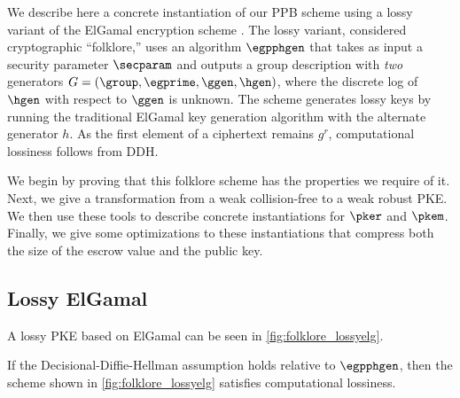 We describe here a concrete instantiation of our PPB scheme using a lossy variant of the ElGamal encryption scheme \cite{C:ElGamal84}.
% 
The lossy variant, considered cryptographic ``folklore,'' uses an algorithm $\egpphgen$ that takes as input a security parameter $\secparam$ and outputs a group description with \emph{two} generators $G = (\group, \egprime, \ggen, \hgen)$, where the discrete log of $\hgen$ with respect to $\ggen$ is unknown.
The scheme generates lossy keys by running the traditional ElGamal key generation algorithm with the alternate generator $h$.
As the first element of a ciphertext remains $g^r$, computational lossiness follows from DDH.

We begin by proving that this folklore scheme has the properties we require of it.
Next, we give a transformation from a weak collision-free to a weak robust PKE.
We then use these tools to describe concrete instantiations for $\pker$ and $\pkem$.
Finally, we give some optimizations to these instantiations that compress both the size of the escrow value and the public key.

\subsection{Lossy ElGamal}

A lossy PKE based on ElGamal can be seen in \cref{fig:folklore_lossyelg}.


\begin{theorem}
	If the Decisional-Diffie-Hellman assumption holds relative to $\egpphgen$, then the scheme shown in \cref{fig:folklore_lossyelg} satisfies computational lossiness.
\end{theorem}

